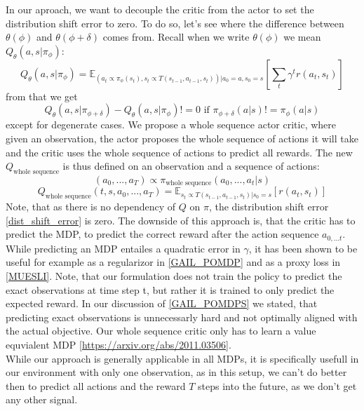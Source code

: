 In our aproach, we want to decouple the critic from the actor to set the distribution shift error to zero. To do so, let's see where the difference between 
$\theta(\phi)$ and $\theta(\phi + \delta)$ comes from. Recall when we write $\theta(\phi)$ we mean $Q_{\theta}(a,s|\pi_{\phi})$:
\begin{equation*}
    Q_{\theta}(a,s|\pi_{\phi}) = \mathbb{E}_{(a_t \propto \pi_{\phi}(s_t), s_t \propto T(s_{t-1}, a_{t-1}, s_t))|a_0=a, s_0=s}\left[\sum_t \gamma^t r(a_t, s_t)\right]
\end{equation*}
from that we get
\begin{equation}
    Q_{\theta }(a,s|\pi_{\phi + \delta}) - Q_{\theta}(a,s|\pi_{\phi}) != 0 \text{ if } \pi_{\phi + \delta}(a|s) != \pi_{\phi}(a|s)
\end{equation}
except for degenerate cases. We propose a whole sequence actor critic, where given an observation, the actor proposes the whole sequence of actions it will 
take and the critic uses the whole sequence of actions to predict all rewards. The new $Q_{\text{whole sequence}}$ is thus defined on an observation and a 
sequence of actions: 
\begin{equation}
    (a_0, ..., a_T) \propto \pi_{\text{whole sequence}}(a_0, ..., a_t|s)
\end{equation}
\begin{equation*}
    Q_{\text{whole sequence}}(t, s, a_0, ..., a_T) = \mathbb{E}_{s_t \propto T(s_{t-1}, a_{t-1}, s_t) | s_0=s}\left[r(a_t, s_t)\right]
\end{equation*}
Note, that as there is no dependency of $Q$ on $\pi$, the distribution shift error \ref{dist_shift_error} is zero. The downside of this approach is, that the 
critic has to predict the MDP, to predict the correct reward after the action sequence $a_{0, ... t}$. While predicting an MDP entailes a quadratic error in 
$\gamma$, it has been shown to be useful for example as a regularizor in \ref{GAIL_POMDP} and as a proxy loss in \ref{MUESLI}. Note, that our 
formulation does not train the policy to predict the exact observations at time step t, but rather it is trained to only predict the expected reward. 
In our discussion of \ref{GAIL_POMDPS} we stated, that predicting exact observations is unnecessarly hard and not optimally aligned with the actual objective. 
Our whole sequence critic only has to learn a value equvialent MDP \ref{https://arxiv.org/abs/2011.03506}.\\
While our approach is generally applicable in all MDPs, it is specifically usefull in our environment with only one observation, as in this setup, we can't do 
better then to predict all actions and the reward $T$ steps into the future, as we don't get any other signal.\\ \\

